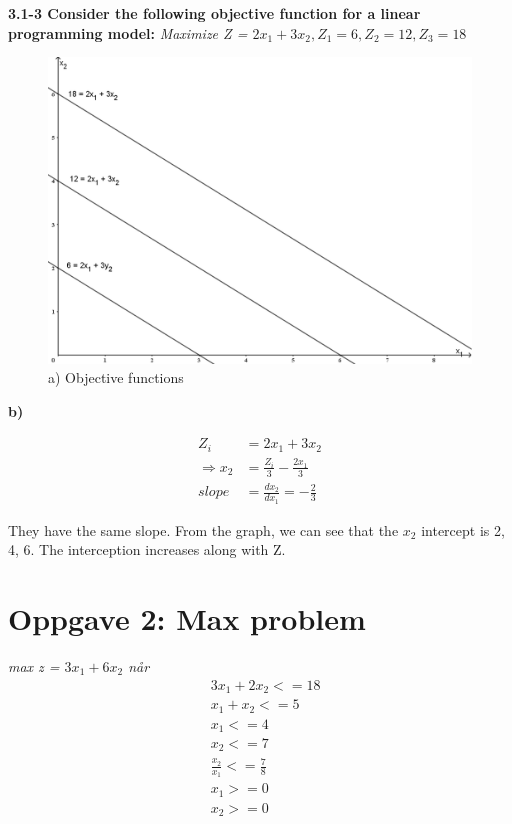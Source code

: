 \documentclass{article}
\begin{document}
    \pagebreak\small\textbf{3.1-3 Consider the following objective function for a linear programming model:} \textit{Maximize Z = $2x_1 + 3x_2, Z_1 = 6, Z_2 = 12, Z_3 = 18$}
    \begin{figure}[ht]
        \centering
        \includegraphics[width=0.8\linewidth]{img/3.1-3a.PNG}
        \caption{a) Objective functions}
    \end{figure}
    
    \small\textbf{b) }
    
    \begin{align*}
        Z_i &= 2x_1 + 3x_2 \\
        \Rightarrow x_2 &= \frac{Z_i}{3} - \frac{2x_1}{3} \\   
        slope &= \frac{dx_2}{dx_1} = -\frac{2}{3}     
    \end{align*}
    
    They have the same slope. From the graph, we can see that the $x_2$ intercept is 2, 4, 6. The interception increases along with Z.
    
    \pagebreak\section*{\textbf{Oppgave 2: Max problem}}
    
    \small\textit{max z = $3x_1 + 6x_2$ når}
    \begin{align*}
        & 3x_1 + 2x_2 <= 18 \\
        & x_1 + x_2 <= 5 \\
        & x_1 <= 4 \\
        & x_2 <= 7 \\
        & \frac{x_2}{x_1} <= \frac{7}{8}\\
        & x_1 >= 0 \\
        & x_2 >= 0
    \end{align*}
    
\end{document}
